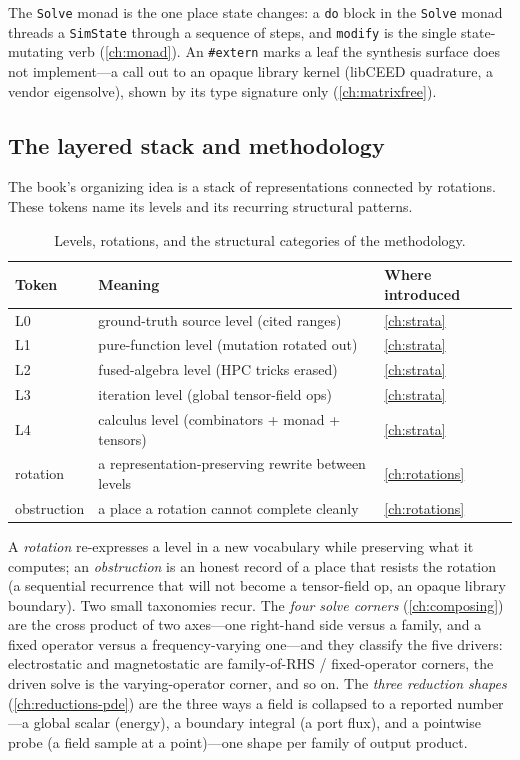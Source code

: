 The \texttt{Solve} monad is the one place state changes: a \texttt{do} block in
the \texttt{Solve} monad threads a \texttt{SimState} through a sequence of steps,
and \texttt{modify} is the single state-mutating verb (\cref{ch:monad}). An
\texttt{\#extern} marks a leaf the synthesis surface does not implement---a call
out to an opaque library kernel (libCEED quadrature, a vendor eigensolve), shown
by its type signature only (\cref{ch:matrixfree}).

\subsection{The layered stack and methodology}

The book's organizing idea is a stack of representations connected by rotations.
These tokens name its levels and its recurring structural patterns.

\begin{table}[ht]
\centering
\small
\caption[The layered stack]{Levels, rotations, and the structural categories of
the methodology.}
\label{tab:gl-method}
\begin{tabular}{@{}lll@{}}
\toprule
Token & Meaning & Where introduced \\
\midrule
L0 & ground-truth source level (cited ranges) & \cref{ch:strata} \\
L1 & pure-function level (mutation rotated out) & \cref{ch:strata} \\
L2 & fused-algebra level (HPC tricks erased) & \cref{ch:strata} \\
L3 & iteration level (global tensor-field ops) & \cref{ch:strata} \\
L4 & calculus level (combinators + monad + tensors) & \cref{ch:strata} \\
rotation & a representation-preserving rewrite between levels & \cref{ch:rotations} \\
obstruction & a place a rotation cannot complete cleanly & \cref{ch:rotations} \\
\bottomrule
\end{tabular}
\end{table}

A \emph{rotation} re-expresses a level in a new vocabulary while preserving what
it computes; an \emph{obstruction} is an honest record of a place that resists
the rotation (a sequential recurrence that will not become a tensor-field op, an
opaque library boundary). Two small taxonomies recur. The \emph{four solve
corners} (\cref{ch:composing}) are the cross product of two axes---one
right-hand side versus a family, and a fixed operator versus a frequency-varying
one---and they classify the five drivers: electrostatic and magnetostatic are
family-of-RHS / fixed-operator corners, the driven solve is the
varying-operator corner, and so on. The \emph{three reduction shapes}
(\cref{ch:reductions-pde}) are the three ways a field is collapsed to a
reported number---a global scalar (energy), a boundary integral (a port flux),
and a pointwise probe (a field sample at a point)---one shape per family of
output product.

